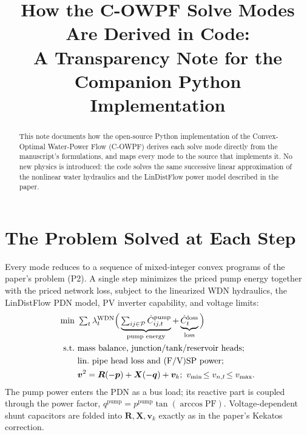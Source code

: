 \documentclass[9pt,twocolumn]{IEEEtran}
\newcommand{\pump}{\ensuremath{\mathrm{pump}}}
\newcommand{\WDN}{\ensuremath{\mathrm{WDN}}}
\begin{document}
\title{\vspace{-2em}\normalsize How the C-OWPF Solve Modes Are Derived in Code:\\
A Transparency Note for the Companion Python Implementation}
\author{}
\maketitle\thispagestyle{empty}

\begin{abstract}
\footnotesize This note documents how the open-source Python implementation of the
Convex-Optimal Water-Power Flow (C-OWPF) derives each solve mode directly from the manuscript's
formulations, and maps every mode to the source that implements it. No new physics is introduced:
the code solves the same successive linear approximation of the nonlinear water hydraulics and the
LinDistFlow power model described in the paper.
\end{abstract}

\section{The Problem Solved at Each Step}
Every mode reduces to a sequence of mixed-integer convex programs of the paper's problem (P2). A
single step minimizes the priced pump energy together with the priced network loss, subject to the
linearized WDN hydraulics, the LinDistFlow PDN model, PV inverter capability, and voltage limits:
\begin{align}
\min~ & \textstyle\sum_{t}\lambda^{\WDN}_{t}\Big(\underbrace{\textstyle\sum_{ij\in\mathcal{P}}\hat{C}^{\pump}_{ij,t}}_{\text{pump energy}}
      + \underbrace{\hat{C}^{\text{loss}}_{t}}_{\text{loss}}\Big) \notag\\
\text{s.t.}~ & \text{mass balance, junction/tank/reservoir heads;} \notag\\
      & \text{lin.\ pipe head loss and (F/V)SP power;} \notag\\
      & \bm{v}^2 = \bm{R}(-\bm{p})+\bm{X}(-\bm{q})+\bm{v}_k;~ v_{\min}\!\le v_{n,t}\!\le v_{\max}. \notag
\end{align}
The pump power enters the PDN as a bus load; its reactive part is coupled through the power factor,
$q^{\pump}=p^{\pump}\tan(\arccos \mathrm{PF})$. Voltage-dependent shunt capacitors are folded into
$\bm{R},\bm{X},\bm{v}_k$ exactly as in the paper's Kekatos correction.
\end{document}
